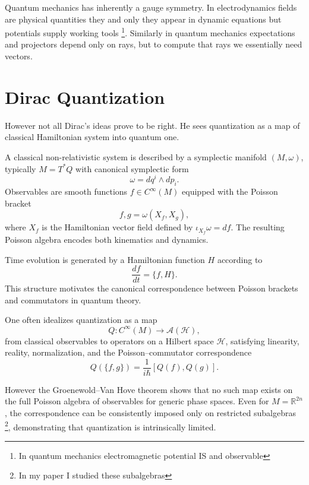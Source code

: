 Quantum mechanics has inherently a gauge symmetry. In electrodynamics
fields are physical quantities they and only they appear in dynamic 
equations but potentials supply working tools \footnote{ In quantum 
mechanics electromagnetic potential IS and observable}. Similarly
in quantum mechanics expectations and projectors depend only on
rays, but to compute that rays we essentially need vectors.

\section{Dirac Quantization}
\label{cq:dirac-quantization}
However  not all Dirac's ideas prove to be right. He sees
quantization as a map of classical Hamiltonian system into
quantum one.

A classical non-relativistic system is described by a symplectic manifold $(M,\omega)$, 
typically $M=T^*Q$ with canonical symplectic form
\begin{equation}
\omega = dq^i \wedge dp_i.
\end{equation}
Observables are smooth functions $f \in C^\infty(M)$ equipped with the Poisson bracket
\begin{equation}
{f,g} = \omega(X_f,X_g),
\end{equation}
where $X_f$ is the Hamiltonian vector field defined by $\iota_{X_f}\omega = df$. 
The resulting Poisson algebra encodes both kinematics and dynamics.

Time evolution is generated by a Hamiltonian function $H$ according to
\begin{equation}
\frac{df}{dt} = \{f,H\}.
\end{equation}
This structure motivates the canonical correspondence between Poisson brackets and 
commutators in quantum theory.

One often idealizes quantization as a map
\begin{equation}
Q : C^\infty(M) \to \mathcal{A}(\mathcal{H}),
\end{equation}
from classical observables to operators on a Hilbert space $\mathcal{H}$, satisfying 
linearity, reality, normalization, and the Poisson--commutator correspondence
\begin{equation}
    \label{cq:pcc}
Q(\{f,g\}) = \frac{1}{i\hbar}[Q(f),Q(g)].
\end{equation}

However the Groenewold--Van Hove theorem shows that no such map exists on the full 
Poisson algebra of observables for generic phase spaces. 
Even for $M=\mathbb{R}^{2n}$, the correspondence can be consistently imposed only on 
restricted subalgebras \footnote{ In my paper \cite{panfil-q} I studied these subalgebras},
demonstrating that quantization is intrinsically limited.

